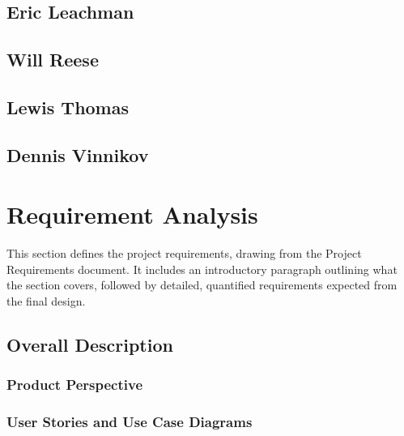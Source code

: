 \documentclass{article}
\begin{document}
    \subsection{Eric Leachman}

    \subsection{Will Reese}

    \subsection{Lewis Thomas}

    \subsection{Dennis Vinnikov}
    


\newpage


\section{Requirement Analysis}

This section defines the project requirements, drawing from the Project Requirements document. It includes an introductory paragraph outlining what the section covers, followed by detailed, quantified requirements expected from the final design. 

    \subsection{Overall Description}
    
        \subsubsection{Product Perspective}
        
        \subsubsection{User Stories and Use Case Diagrams}
        
\end{document}
